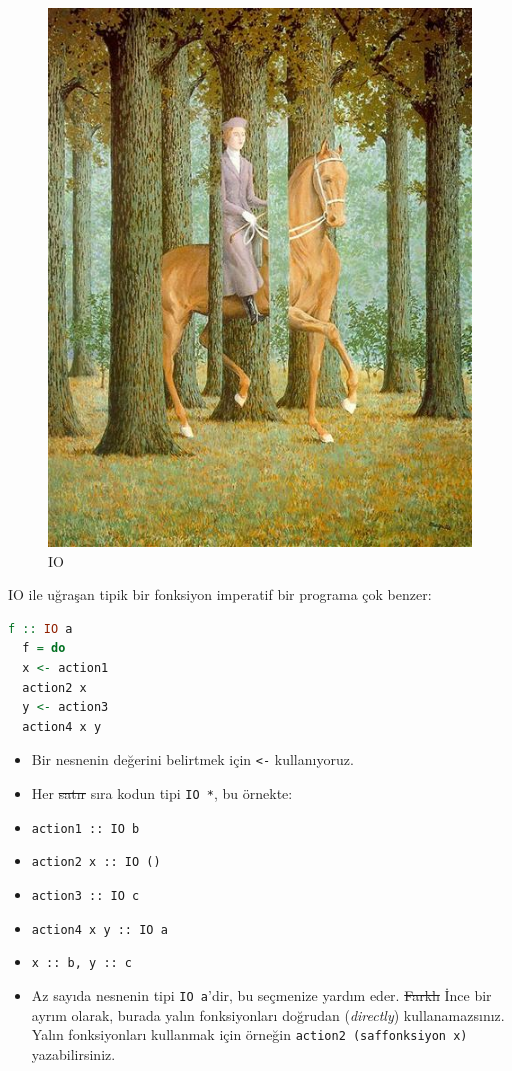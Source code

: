\documentclass[a4paper,14pt,openany]{extbook} %
\providecommand{\tightlist}{%
  \setlength{\itemsep}{0pt}\setlength{\parskip}{0pt}}
\let\emph\textit
\begin{document}
\begin{figure}[htbp]
  \centering
  \includegraphics{img/magritte_carte_blanche.jpg}
  \caption{IO}
\end{figure}

IO ile uğraşan tipik bir fonksiyon imperatif bir programa çok benzer:

\begin{lstlisting}[language=Haskell]
  f :: IO a
  f = do
  x <- action1
  action2 x
  y <- action3
  action4 x y
\end{lstlisting}

  \begin{itemize}
    \tightlist
  \item Bir nesnenin değerini belirtmek için \lstinline!<-! kullanıyoruz.
  \item Her \st{satır} sıra kodun tipi \lstinline!IO *!, bu örnekte:
  \item \lstinline!action1 :: IO b!
  \item \lstinline!action2 x :: IO ()!
  \item \lstinline!action3 :: IO c!
  \item \lstinline!action4 x y :: IO a!
  \item \lstinline!x :: b, y :: c!
  \item Az sayıda nesnenin tipi \lstinline!IO a!'dir, bu seçmenize yardım
    eder. \st{Farklı} İnce bir ayrım olarak, burada yalın fonksiyonları doğrudan (\emph{directly})
    kullanamazsınız. Yalın fonksiyonları kullanmak için örneğin
    \lstinline!action2 (saffonksiyon x)! yazabilirsiniz.
  \end{itemize}
\end{document}
